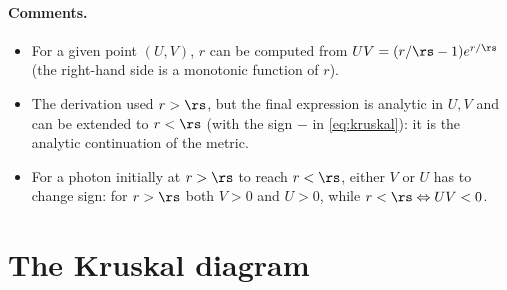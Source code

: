\paragraph{Comments.}
\begin{itemize}
\item For a given point $(U,V)$, $r$ can be computed from $UV=(r/\rs-1)e^{r/\rs}$ (the right-hand side is a monotonic function of $r$).
\item The derivation used $r>\rs$, but the final expression is analytic in $U,V$ and can be extended to $r<\rs$ (with the sign $-$ in \eqref{eq:kruskal}): it is the analytic continuation of the metric.
\item For a photon initially at $r>\rs$ to reach $r<\rs$, either $V$ or $U$ has to change sign: for $r>\rs$ both $V>0$ and $U>0$, while $r<\rs\Leftrightarrow UV<0$.
\end{itemize}

\section{The Kruskal diagram}

